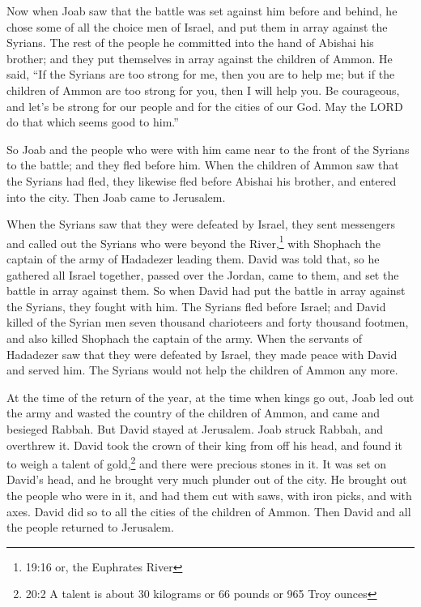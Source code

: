 \myverse{}Now when Joab saw that the battle was set against him before
and behind, he chose some of all the choice men of Israel, and put them in array against the Syrians.
\myverse{}The rest of the people he committed into the hand of Abishai his brother;
and they put themselves in array against the children of Ammon.
\myverse{}He said, “If the Syrians are too strong for me, then you are to help me;
but if the children of Ammon are too strong for you, then I will help you.
\myverse{}Be courageous, and let’s be strong for our people and for the cities of our
God. May the LORD do that which seems good to him.”

\myverse{}So Joab and the people who were with him came near to the front
of the Syrians to the battle; and they fled before him.
\myverse{}When the children of Ammon saw that the Syrians had fled, they likewise fled
before Abishai his brother, and entered into the city. Then Joab came to Jerusalem.

\myverse{}When the Syrians saw that they were defeated by Israel, they
sent messengers and called out the Syrians who were beyond the River,\footnote{19:16 or, the Euphrates River} with Shophach the captain of the army of Hadadezer leading them.
\myverse{}David was told that, so he gathered all Israel together, passed over the
Jordan, came to them, and set the battle in array against them. So when David had put the battle in array
against the Syrians, they fought with him.
\myverse{}The Syrians fled before Israel; and David killed of the Syrian men seven
thousand charioteers and forty thousand footmen, and also killed Shophach the captain of the army.
\myverse{}When the servants of Hadadezer saw that they were defeated by Israel, they
made peace with David and served him. The Syrians would not help the children of Ammon any more.


\mychapter{} \myverse*{}At the time of the return of the year, at the time when kings
go out, Joab led out the army and wasted the country of the children of Ammon, and came and besieged Rabbah.
But David stayed at Jerusalem. Joab struck Rabbah, and overthrew it.
\myverse{}David took the crown of their king from off his head, and found it to weigh
a talent of gold,\footnote{20:2 A talent is about 30 kilograms or 66 pounds or 965 Troy ounces} and there were precious
stones in it. It was set on David’s head, and he brought very much plunder out of the city.
\myverse{}He brought out the people who were in it, and had them cut with saws, with
iron picks, and with axes. David did so to all the cities of the children of Ammon. Then David and all
the people returned to Jerusalem.

